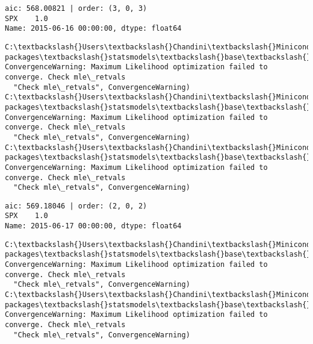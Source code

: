 \documentclass[11pt]{article}
\begin{document}
    \begin{Verbatim}[commandchars=\\\{\}]
aic: 568.00821 | order: (3, 0, 3)
SPX    1.0
Name: 2015-06-16 00:00:00, dtype: float64

    \end{Verbatim}

    \begin{Verbatim}[commandchars=\\\{\}]
C:\textbackslash{}Users\textbackslash{}Chandini\textbackslash{}Miniconda3\textbackslash{}envs\textbackslash{}auquan\textbackslash{}lib\textbackslash{}site-packages\textbackslash{}statsmodels\textbackslash{}base\textbackslash{}model.py:496: ConvergenceWarning: Maximum Likelihood optimization failed to converge. Check mle\_retvals
  "Check mle\_retvals", ConvergenceWarning)
C:\textbackslash{}Users\textbackslash{}Chandini\textbackslash{}Miniconda3\textbackslash{}envs\textbackslash{}auquan\textbackslash{}lib\textbackslash{}site-packages\textbackslash{}statsmodels\textbackslash{}base\textbackslash{}model.py:496: ConvergenceWarning: Maximum Likelihood optimization failed to converge. Check mle\_retvals
  "Check mle\_retvals", ConvergenceWarning)
C:\textbackslash{}Users\textbackslash{}Chandini\textbackslash{}Miniconda3\textbackslash{}envs\textbackslash{}auquan\textbackslash{}lib\textbackslash{}site-packages\textbackslash{}statsmodels\textbackslash{}base\textbackslash{}model.py:496: ConvergenceWarning: Maximum Likelihood optimization failed to converge. Check mle\_retvals
  "Check mle\_retvals", ConvergenceWarning)

    \end{Verbatim}

    \begin{Verbatim}[commandchars=\\\{\}]
aic: 569.18046 | order: (2, 0, 2)
SPX    1.0
Name: 2015-06-17 00:00:00, dtype: float64

    \end{Verbatim}

    \begin{Verbatim}[commandchars=\\\{\}]
C:\textbackslash{}Users\textbackslash{}Chandini\textbackslash{}Miniconda3\textbackslash{}envs\textbackslash{}auquan\textbackslash{}lib\textbackslash{}site-packages\textbackslash{}statsmodels\textbackslash{}base\textbackslash{}model.py:496: ConvergenceWarning: Maximum Likelihood optimization failed to converge. Check mle\_retvals
  "Check mle\_retvals", ConvergenceWarning)
C:\textbackslash{}Users\textbackslash{}Chandini\textbackslash{}Miniconda3\textbackslash{}envs\textbackslash{}auquan\textbackslash{}lib\textbackslash{}site-packages\textbackslash{}statsmodels\textbackslash{}base\textbackslash{}model.py:496: ConvergenceWarning: Maximum Likelihood optimization failed to converge. Check mle\_retvals
  "Check mle\_retvals", ConvergenceWarning)

    \end{Verbatim}
\end{document}
